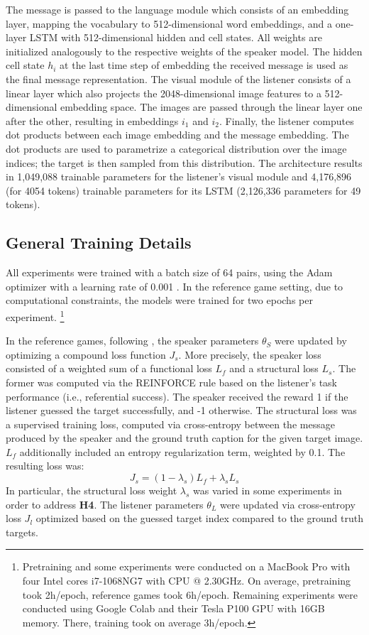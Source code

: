The message is passed to the language module which consists of an embedding layer, mapping the vocabulary to 512-dimensional word embeddings, and a one-layer LSTM with 512-dimensional hidden and cell states. All weights are initialized analogously to the respective weights of the speaker model. The hidden cell state $h_i$ at the last time step of embedding the received message is used as the final message representation. 
The visual module of the listener consists of a linear layer which also projects the 2048-dimensional image features to a 512-dimensional embedding space. The images are passed through the linear layer one after the other, resulting in embeddings $i_1$ and $i_2$. Finally, the listener computes dot products between each image embedding and the message embedding. The dot products are used to parametrize a categorical distribution over the image indices; the target is then sampled from this distribution.  
The architecture results in 1,049,088 trainable parameters for the listener's visual module and 4,176,896 (for 4054 tokens) trainable parameters for its LSTM (2,126,336 parameters for 49 tokens).


\subsection{General Training Details}
\label{general_train_details}
All experiments were trained with a batch size of 64 pairs, using the Adam optimizer with a learning rate  of 0.001 \parencite{kingma2014adam}. In the reference game setting, due to computational constraints, the models were trained for two epochs per experiment. \footnote{Pretraining and some experiments were conducted on a MacBook Pro with four Intel cores i7-1068NG7 with CPU @ 2.30GHz. On average, pretraining took 2h/epoch, reference games took 6h/epoch. Remaining experiments were conducted using Google Colab and their Tesla P100 GPU with 16GB memory. There, training took on average 3h/epoch.} 

In the reference games, following \cite{lazaridou2020multi}, the speaker parameters $\theta_S$ were updated by optimizing a compound loss function $J_s$. More precisely, the speaker loss consisted of a weighted sum of a functional loss $L_f$ and a structural loss $L_s$. The former was computed via the REINFORCE rule based on the listener's task performance (i.e., referential success). The speaker received the reward 1 if the listener guessed the target successfully, and -1 otherwise. The structural loss was a supervised training loss, computed via cross-entropy between the message produced by the speaker and the ground truth caption for the given target image. $L_f$ additionally included an entropy regularization term, weighted by 0.1. The resulting loss was:
\begin{equation}
J_s = (1-\lambda_s)L_f + \lambda_s L_s
\end{equation}
In particular, the structural loss weight $\lambda_s$ was varied in some experiments in order to address \textbf{H4}.
The listener parameters $\theta_L$ were updated via cross-entropy loss $J_l$ optimized based on the guessed target index compared to the ground truth targets. 

